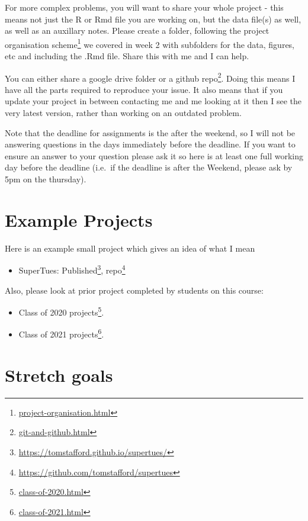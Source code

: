 \documentclass[
  12pt,
  a5paper,
]{book}
\DeclareRobustCommand{\href}[2]{#2\footnote{\url{#1}}}
\providecommand{\tightlist}{%
  \setlength{\itemsep}{0pt}\setlength{\parskip}{0pt}}
\begin{document}
For more complex problems, you will want to share your whole project - this means not just the R or Rmd file you are working on, but the data file(s) as well, as well as an auxillary notes.
Please create a folder, following the \href{project-organisation.html}{project organisation scheme} we covered in week 2 with subfolders for the data, figures, etc and including the .Rmd file. Share this with me and I can help.

You can either share a google drive folder or a \href{git-and-github.html}{github repo}. Doing this means I have all the parts required to reproduce your issue. It also means that if you update your project in between contacting me and me looking at it then I see the very latest version, rather than working on an outdated problem.

Note that the deadline for assignments is the after the weekend, so I will not be answering questions in the days immediately before the deadline. If you want to ensure an answer to your question please ask it so here is at least one full working day before the deadline (i.e.~if the deadline is after the Weekend, please ask by 5pm on the thursday).

\hypertarget{example-projects}{%
\section{Example Projects}\label{example-projects}}

Here is an example small project which gives an idea of what I mean

\begin{itemize}
\tightlist
\item
  SuperTues: \href{https://tomstafford.github.io/supertues/}{Published}, \href{https://github.com/tomstafford/supertues}{repo}
\end{itemize}

Also, please look at prior project completed by students on this course:

\begin{itemize}
\tightlist
\item
  \href{class-of-2020.html}{Class of 2020 projects}.
\item
  \href{class-of-2021.html}{Class of 2021 projects}.
\end{itemize}

\hypertarget{stretch-goals}{%
\section{Stretch goals}\label{stretch-goals}}
\end{document}
